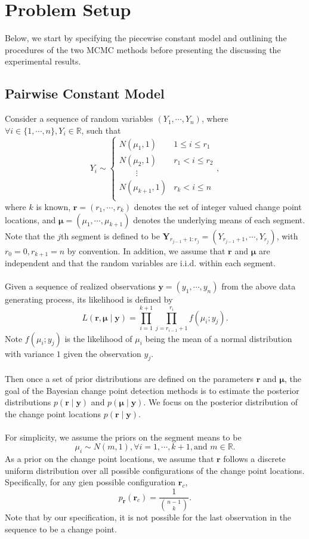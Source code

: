 

\section{Problem Setup}
Below, we start by specifying the piecewise constant model and outlining the procedures of the two MCMC methods before presenting the discussing the experimental results.
\subsection{Pairwise Constant Model}
Consider a sequence of random variables $(Y_1,\cdots,Y_n)$, where $\forall i \in \{1,\cdots,n\}, Y_i \in \mathbb{R}$, such that
\[
Y_i \sim \begin{cases}
N(\mu_1,1) & 1 \leq i \leq r_1 \\
N(\mu_2,1) & r_1 < i \leq r_2 \\
\quad \quad \vdots \\
N(\mu_{k+1},1) & r_k < i \leq n \\
\end{cases},
\]
where $k$ is known, $\bm{r} = (r_1,\cdots,r_k)$ denotes the set of integer valued change point locations, and $\bm{\mu} = (\mu_1,\cdots,\mu_{k+1})$ denotes the underlying means of each segment. Note that the $j$th segment is defined to be $\bm{Y}_{r_{j-1}+1 : r_j} = (Y_{r_{j-1}+1}, \cdots, Y_{r_j})$, with $r_0 = 0, r_{k+1} = n$ by convention. In addition, we assume that $\bm{r}$ and $\bm{\mu}$ are independent and that the random variables are i.i.d. within each segment.\\\\
Given a sequence of realized observations $\bm{y} = (y_1,\cdots,y_n)$ from the above data generating process, its likelihood is defined by
\[
L( \bm{r}, \bm{\mu} \mid \bm{y} ) = \prod_{i=1}^{k+1}\prod_{j=r_{i-1}+1}^{r_i} f(\mu_i; y_j).
\]
Note $f(\mu_i; y_j)$ is the likelihood of $\mu_i$ being the mean of a normal distribution with variance $1$ given the observation $y_j$.\\\\
Then once a set of prior distributions are defined on the parameters $\bm{r}$ and $\bm{\mu}$, the goal of the Bayesian change point detection methods is to estimate the posterior distributions $p(\bm{r} \mid \bm{y})$ and $p(\bm{\mu} \mid \bm{y})$. We focus on the posterior distribution of the change point locations $p(\bm{r} \mid \bm{y})$.\\\\
For simplicity, we assume the priors on the segment means to be
\[
\mu_i \sim N(m, 1), \forall i=1,\cdots,k+1, \text{and } m\in \mathbb{R}.
\]
As a prior on the change point locations, we assume that $\bm{r}$ follows a discrete uniform distribution over all possible configurations of the change point locations. Specifically, for any gien possible configuration $\bm{r}_c$,
\[
p_{\bm{r}}(\bm{r}_c) = \frac{1}{\binom{n-1}{k}}.
\]
Note that by our specification, it is not possible for the last observation in the sequence to be a change point.

